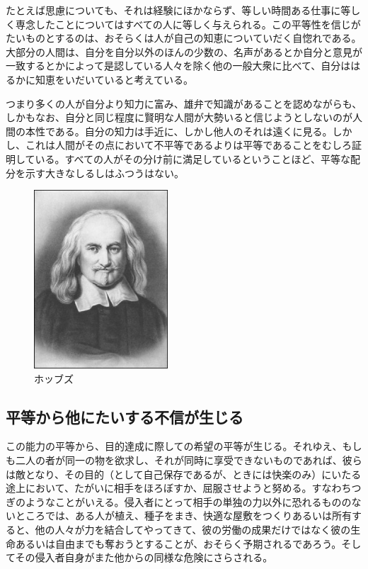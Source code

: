 たとえば思慮についても、それは経験にほかならず、等しい時間ある仕事に等しく専念したことについてはすべての人に等しく与えられる。この平等性を信じがたいものとするのは、おそらくは人が自己の知恵についていだく自惚れである。大部分の人間は、自分を自分以外のほんの少数の、名声があるとか自分と意見が一致するとかによって是認している人々を除く他の一般大衆に比べて、自分ははるかに知恵をいだいていると考えている。

つまり多くの人が自分より知力に富み、雄弁で知識があることを認めながらも、しかもなお、自分と同じ程度に賢明な人間が大勢いると信じようとしないのが人間の本性である。自分の知力は手近に、しかし他人のそれは遠くに見る。しかし、これは人間がその点において不平等であるよりは平等であることをむしろ証明している。すべての人がその分け前に満足しているということほど、平等な配分を示す大きなしるしはふつうはない。


  \begin{figure}[htbp]
    \centering
      \includegraphics[width=50mm]{images/Thomas-Hobbes2.jpg}
    \caption{ホッブズ}
  \end{figure}



\subsection{平等から他にたいする不信が生じる}


この能力の平等から、目的達成に際しての希望の平等が生じる。それゆえ、もしも二人の者が同一の物を欲求し、それが同時に享受できないものであれば、彼らは敵となり、その目的（として自己保存であるが、ときには快楽のみ）にいたる途上において、たがいに相手をほろぼすか、屈服させようと努める。すなわちつぎのようなことがいえる。侵入者にとって相手の単独の力以外に恐れるもののないところでは、ある人が植え、種子をまき、快適な屋敷をつくりあるいは所有すると、他の人々が力を結合してやってきて、彼の労働の成果だけではなく彼の生命あるいは自由までも奪おうとすることが、おそらく予期されるであろう。そしてその侵入者自身がまた他からの同様な危険にさらされる。




